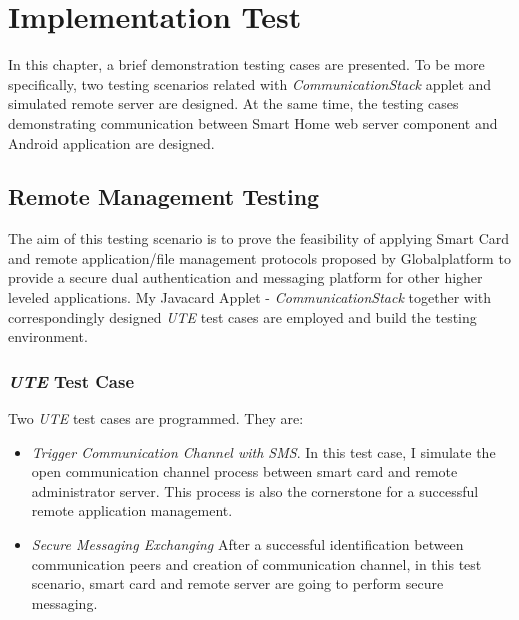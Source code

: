 \chapter{Implementation Test}
In this chapter, a brief demonstration testing cases are presented. To be more specifically, two testing scenarios related with \emph{CommunicationStack} applet and simulated remote server are designed. At the same time, the testing cases demonstrating communication between Smart Home web server component and Android application are designed.

\section{Remote Management Testing}
The aim of this testing scenario is to prove the feasibility of applying Smart Card and remote application/file management protocols proposed by Globalplatform to provide a secure dual authentication and messaging platform for other 
higher leveled applications. My Javacard Applet - \emph{CommunicationStack} together with correspondingly designed \emph{UTE} test cases are employed and build the testing environment.

\subsection{\emph{UTE} Test Case}

Two \emph{UTE} test cases are programmed. They are:
\begin{itemize}
\item \emph{Trigger Communication Channel with SMS}. In this test case, I simulate the open communication channel process between smart card and remote administrator server. This process is also the cornerstone for a successful remote application management.
\item \emph{Secure Messaging Exchanging} After a successful identification between communication peers and creation of communication channel, in this test scenario, smart card and remote server are going to perform secure messaging. 
\end{itemize}

